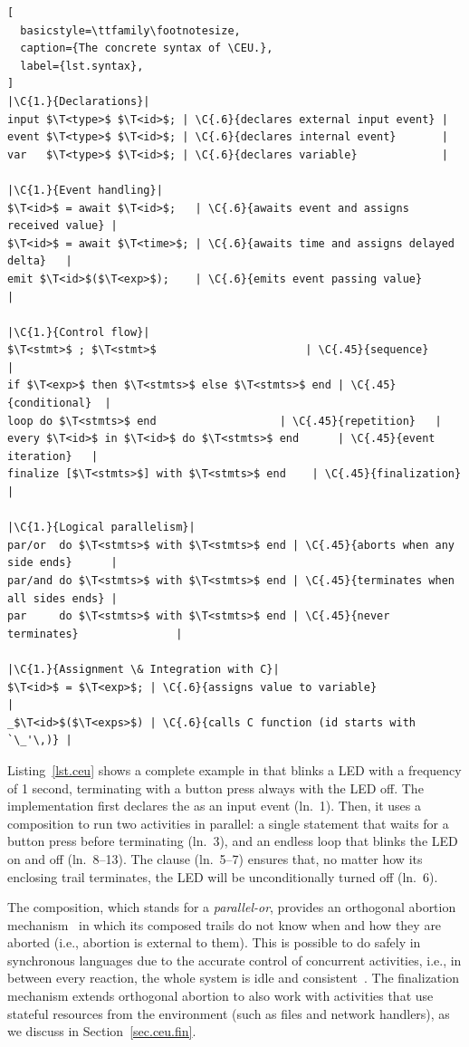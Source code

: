 \bgroup
\def\T<#1>{\langle\mathit{#1}\rangle}
\def\C#1#2{\hfill\rmfamily\itshape\makebox[#1\columnwidth][l]{//~#2}}
\begin{lstlisting}[
  basicstyle=\ttfamily\footnotesize,
  caption={The concrete syntax of \CEU.},
  label={lst.syntax},
]
|\C{1.}{Declarations}|
input $\T<type>$ $\T<id>$; | \C{.6}{declares external input event} |
event $\T<type>$ $\T<id>$; | \C{.6}{declares internal event}       |
var   $\T<type>$ $\T<id>$; | \C{.6}{declares variable}             |

|\C{1.}{Event handling}|
$\T<id>$ = await $\T<id>$;   | \C{.6}{awaits event and assigns received value} |
$\T<id>$ = await $\T<time>$; | \C{.6}{awaits time and assigns delayed delta}   |
emit $\T<id>$($\T<exp>$);    | \C{.6}{emits event passing value}               |

|\C{1.}{Control flow}|
$\T<stmt>$ ; $\T<stmt>$                       | \C{.45}{sequence}     |
if $\T<exp>$ then $\T<stmts>$ else $\T<stmts>$ end | \C{.45}{conditional}  |
loop do $\T<stmts>$ end                   | \C{.45}{repetition}   |
every $\T<id>$ in $\T<id>$ do $\T<stmts>$ end      | \C{.45}{event iteration}   |
finalize [$\T<stmts>$] with $\T<stmts>$ end    | \C{.45}{finalization} |

|\C{1.}{Logical parallelism}|
par/or  do $\T<stmts>$ with $\T<stmts>$ end | \C{.45}{aborts when any side ends}      |
par/and do $\T<stmts>$ with $\T<stmts>$ end | \C{.45}{terminates when all sides ends} |
par     do $\T<stmts>$ with $\T<stmts>$ end | \C{.45}{never terminates}               |

|\C{1.}{Assignment \& Integration with C}|
$\T<id>$ = $\T<exp>$; | \C{.6}{assigns value to variable}                |
_$\T<id>$($\T<exps>$) | \C{.6}{calls C function (id starts with `\_'\,)} |
\end{lstlisting}
\egroup

Listing~\ref{lst.ceu} shows a complete example in \CEU that blinks a LED with a
frequency of 1 second, terminating with a button press always with the LED off.
%
The implementation first declares the  as an input event (ln.~1).
Then, it uses a  composition to run two activities in parallel:
a single statement that waits for a button press before terminating (ln.~3),
and an endless loop that blinks the LED on and off (ln.~8--13).
The  clause (ln.~5--7) ensures that, no matter how its enclosing
trail terminates, the LED will be unconditionally turned off (ln.~6).

The  composition, which stands for a \emph{parallel-or}, provides
an orthogonal abortion mechanism~\cite{esterel.preemption} in which its
composed trails do not know when and how they are aborted (i.e., abortion is
external to them).
%
This is possible to do safely in synchronous languages due to the accurate
control of concurrent activities, i.e., in between every reaction, the whole
system is idle and consistent~\cite{esterel.preemption}.
%
The finalization mechanism extends orthogonal abortion to also work with
activities that use stateful resources from the environment (such as files and
network handlers), as we discuss in Section~\ref{sec.ceu.fin}.
%

